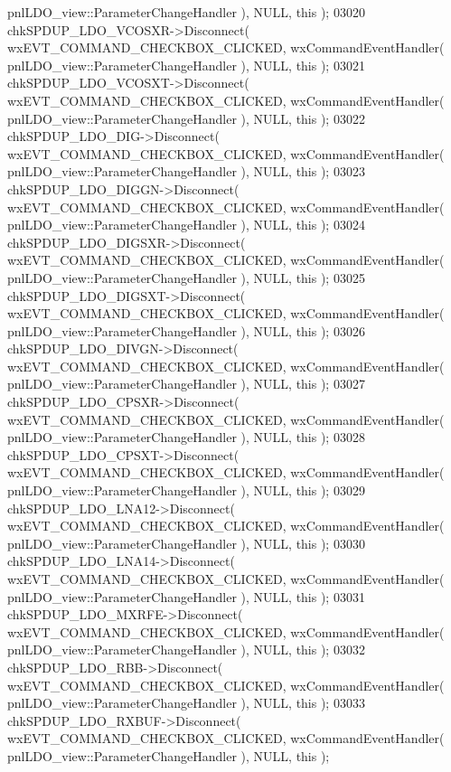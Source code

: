 \begin{DoxyCode}
      pnlLDO_view::ParameterChangeHandler ), NULL, \textcolor{keyword}{this} );
03020     chkSPDUP_LDO_VCOSXR->Disconnect( wxEVT\_COMMAND\_CHECKBOX\_CLICKED, wxCommandEventHandler( 
      pnlLDO_view::ParameterChangeHandler ), NULL, \textcolor{keyword}{this} );
03021     chkSPDUP_LDO_VCOSXT->Disconnect( wxEVT\_COMMAND\_CHECKBOX\_CLICKED, wxCommandEventHandler( 
      pnlLDO_view::ParameterChangeHandler ), NULL, \textcolor{keyword}{this} );
03022     chkSPDUP_LDO_DIG->Disconnect( wxEVT\_COMMAND\_CHECKBOX\_CLICKED, wxCommandEventHandler( 
      pnlLDO_view::ParameterChangeHandler ), NULL, \textcolor{keyword}{this} );
03023     chkSPDUP_LDO_DIGGN->Disconnect( wxEVT\_COMMAND\_CHECKBOX\_CLICKED, wxCommandEventHandler( 
      pnlLDO_view::ParameterChangeHandler ), NULL, \textcolor{keyword}{this} );
03024     chkSPDUP_LDO_DIGSXR->Disconnect( wxEVT\_COMMAND\_CHECKBOX\_CLICKED, wxCommandEventHandler( 
      pnlLDO_view::ParameterChangeHandler ), NULL, \textcolor{keyword}{this} );
03025     chkSPDUP_LDO_DIGSXT->Disconnect( wxEVT\_COMMAND\_CHECKBOX\_CLICKED, wxCommandEventHandler( 
      pnlLDO_view::ParameterChangeHandler ), NULL, \textcolor{keyword}{this} );
03026     chkSPDUP_LDO_DIVGN->Disconnect( wxEVT\_COMMAND\_CHECKBOX\_CLICKED, wxCommandEventHandler( 
      pnlLDO_view::ParameterChangeHandler ), NULL, \textcolor{keyword}{this} );
03027     chkSPDUP_LDO_CPSXR->Disconnect( wxEVT\_COMMAND\_CHECKBOX\_CLICKED, wxCommandEventHandler( 
      pnlLDO_view::ParameterChangeHandler ), NULL, \textcolor{keyword}{this} );
03028     chkSPDUP_LDO_CPSXT->Disconnect( wxEVT\_COMMAND\_CHECKBOX\_CLICKED, wxCommandEventHandler( 
      pnlLDO_view::ParameterChangeHandler ), NULL, \textcolor{keyword}{this} );
03029     chkSPDUP_LDO_LNA12->Disconnect( wxEVT\_COMMAND\_CHECKBOX\_CLICKED, wxCommandEventHandler( 
      pnlLDO_view::ParameterChangeHandler ), NULL, \textcolor{keyword}{this} );
03030     chkSPDUP_LDO_LNA14->Disconnect( wxEVT\_COMMAND\_CHECKBOX\_CLICKED, wxCommandEventHandler( 
      pnlLDO_view::ParameterChangeHandler ), NULL, \textcolor{keyword}{this} );
03031     chkSPDUP_LDO_MXRFE->Disconnect( wxEVT\_COMMAND\_CHECKBOX\_CLICKED, wxCommandEventHandler( 
      pnlLDO_view::ParameterChangeHandler ), NULL, \textcolor{keyword}{this} );
03032     chkSPDUP_LDO_RBB->Disconnect( wxEVT\_COMMAND\_CHECKBOX\_CLICKED, wxCommandEventHandler( 
      pnlLDO_view::ParameterChangeHandler ), NULL, \textcolor{keyword}{this} );
03033     chkSPDUP_LDO_RXBUF->Disconnect( wxEVT\_COMMAND\_CHECKBOX\_CLICKED, wxCommandEventHandler( 
      pnlLDO_view::ParameterChangeHandler ), NULL, \textcolor{keyword}{this} );

\end{DoxyCode}
